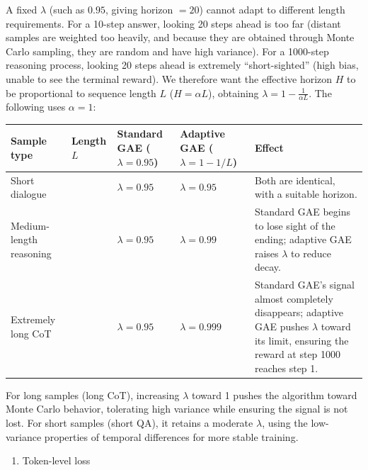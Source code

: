 A fixed \(\lambda\) (such as \(0.95\), giving horizon \(=20\)) cannot adapt to different length requirements. For a 10-step answer, looking 20 steps ahead is too far (distant samples are weighted too heavily, and because they are obtained through Monte Carlo sampling, they are random and have high variance). For a 1000-step reasoning process, looking 20 steps ahead is extremely ``short-sighted'' (high bias, unable to see the terminal reward). We therefore want the effective horizon \(H\) to be proportional to sequence length \(L\) (\(H=\alpha L\)), obtaining \(\lambda=1-\frac{1}{\alpha L}\). The following uses \(\alpha=1\):

\begin{longtable}[]{@{}
  >{\raggedright\arraybackslash}p{}
  >{\raggedleft\arraybackslash}p{}
  >{\raggedright\arraybackslash}p{}
  >{\raggedright\arraybackslash}p{}
  >{\raggedright\arraybackslash}p{}@{}}
\toprule
Sample type & Length \(L\) & Standard GAE (\(\lambda=0.95\)) & Adaptive GAE (\(\lambda=1-1/L\)) & Effect \\
\midrule
\endhead
Short dialogue & 20 & \(\lambda=0.95\) & \(\lambda=0.95\) & Both are identical, with a suitable horizon. \\
Medium-length reasoning & 100 & \(\lambda=0.95\) & \(\lambda=0.99\) & Standard GAE begins to lose sight of the ending; adaptive GAE raises \(\lambda\) to reduce decay. \\
Extremely long CoT & 1000 & \(\lambda=0.95\) & \(\lambda=0.999\) & Standard GAE's signal almost completely disappears; adaptive GAE pushes \(\lambda\) toward its limit, ensuring the reward at step 1000 reaches step 1. \\
\bottomrule
\end{longtable}

For long samples (long CoT), increasing \(\lambda\) toward 1 pushes the algorithm toward Monte Carlo behavior, tolerating high variance while ensuring the signal is not lost. For short samples (short QA), it retains a moderate \(\lambda\), using the low-variance properties of temporal differences for more stable training.

\begin{enumerate}
\def\labelenumi{\arabic{enumi}.}
\setcounter{enumi}{3}
\tightlist
\item
  Token-level loss
\end{enumerate}

